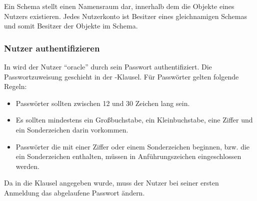 
          \begin{merke}
            Ein Schema stellt einen Namensraum dar, innerhalb dem die Objekte eines Nutzers existieren. Jedes Nutzerkonto ist Besitzer eines gleichnamigen Schemas und somit Besitzer der Objekte im Schema.
          \end{merke}
        \subsubsection{Nutzer authentifizieren}
          In  wird der Nutzer \enquote{oracle} durch sein Passwort authentifiziert. Die  Passwortzuweisung geschieht in der -Klausel. Für Passwörter gelten folgende Regeln:
          \begin{itemize}
            \item Passwörter sollten zwischen 12 und 30 Zeichen lang sein.
            \item Es sollten mindestens ein Großbuchstabe, ein Kleinbuchstabe, eine Ziffer und ein Sonderzeichen darin vorkommen.
            \item Passwörter die mit einer Ziffer oder einem Sonderzeichen beginnen, bzw. die ein Sonderzeichen enthalten, müssen in Anführungszeichen eingeschlossen werden.
          \end{itemize}
          Da in  die Klausel  angegeben wurde, muss der Nutzer bei seiner ersten Anmeldung das abgelaufene Passwort ändern.
